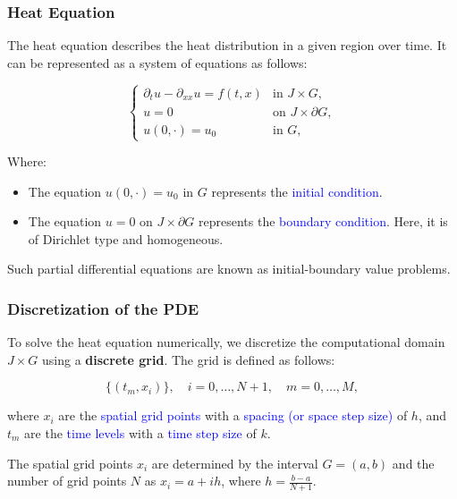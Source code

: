 \subsubsection{Heat Equation}

The heat equation describes the heat distribution in a given region over time. It can be represented as a system of equations as follows:

\begin{equation*}
\begin{cases}
\partial_t u - \partial_{xx} u = f(t, x) & \text{in } J \times G, \\
u = 0 & \text{on } J \times \partial G, \\
u(0, \cdot) = u_0 & \text{in } G,
\end{cases}
\end{equation*}

Where:
\begin{itemize}
\item The equation $u(0, \cdot) = u_0$ in $G$ represents the \textcolor{blue}{initial condition}.
\item The equation $u = 0$ on $J \times \partial G$ represents the \textcolor{blue}{boundary condition}. Here, it is of Dirichlet type and homogeneous.
\end{itemize}

Such partial differential equations are known as initial-boundary value problems.

\subsubsection{Discretization of the PDE}

To solve the heat equation numerically, we discretize the computational domain $J \times G$ using a \textbf{discrete grid}. The grid is defined as follows:

\begin{equation*}
\{(t_m, x_i)\}, \quad i = 0, \ldots, N+1, \quad m = 0, \ldots, M,
\end{equation*}

where $x_i$ are the \textcolor{blue}{spatial grid points} with a \textcolor{blue}{spacing (or space step size)} of $h$, and $t_m$ are the \textcolor{blue}{time levels} with a \textcolor{blue}{time step size} of $k$.

\medskip

The spatial grid points $x_i$ are determined by the interval $G = (a, b)$ and the number of grid points $N$ as $x_i = a + ih$, where $h = \frac{b-a}{N+1}$. 

